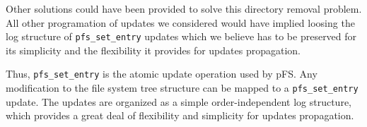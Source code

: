 
Other solutions could have been provided to solve this directory
removal problem. All other programation of updates we considered would
have implied loosing the log structure of {\tt pfs\_set\_entry}
updates which we believe has to be preserved for its simplicity and
the flexibility it provides for updates propagation.

Thus, {\tt pfs\_set\_entry} is the atomic update operation used by
pFS. Any modification to the file system tree structure can be mapped
to a {\tt pfs\_set\_entry} update. The updates are organized as a
simple order-independent log structure, which provides a great deal of
flexibility and simplicity for updates propagation.

